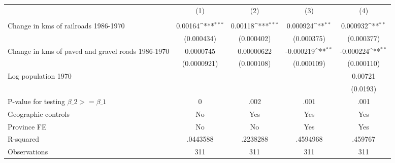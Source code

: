 {
\def\sym#1{\ifmmode^{#1}\else\(^{#1}\)\fi}
\begin{tabular}{l*{4}{c}}
\hline\hline
                &\multicolumn{1}{c}{(1)}&\multicolumn{1}{c}{(2)}&\multicolumn{1}{c}{(3)}&\multicolumn{1}{c}{(4)}\\
                &\multicolumn{1}{c}{}&\multicolumn{1}{c}{}&\multicolumn{1}{c}{}&\multicolumn{1}{c}{}\\
\hline
Change in kms of railroads 1986-1970&  0.00164\sym{***}&  0.00118\sym{***}& 0.000924\sym{**} & 0.000932\sym{**} \\
                &(0.000434)         &(0.000402)         &(0.000375)         &(0.000377)         \\
[1em]
Change in kms of paved and gravel roads 1986-1970&0.0000745         &0.00000622         &-0.000219\sym{**} &-0.000224\sym{**} \\
                &(0.0000921)         &(0.000108)         &(0.000109)         &(0.000110)         \\
[1em]
Log population 1970&                  &                  &                  &  0.00721         \\
                &                  &                  &                  & (0.0193)         \\
\hline
P-value for testing $\beta\_{2} >= \beta\_{1}$&        0         &     .002         &     .001         &     .001         \\
Geographic controls&       No         &      Yes         &      Yes         &      Yes         \\
Province FE     &       No         &       No         &      Yes         &      Yes         \\
R-squared       & .0443588         & .2238288         & .4594968         &  .459767         \\
Observations    &      311         &      311         &      311         &      311         \\
\hline\hline
\end{tabular}
}
